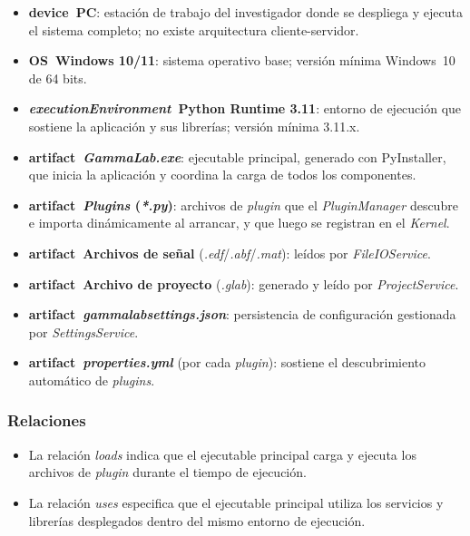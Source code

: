 \documentclass[12pt,letterpaper,oneside]{article}
\DeclareRobustCommand{\_}{\textunderscore\allowbreak}
\begin{document}
\begin{itemize}
    \item \textbf{\guillemotleft device\guillemotright\ PC}: estaci\'on de trabajo del investigador donde se despliega y ejecuta el sistema completo; no existe arquitectura cliente-servidor.
    \item \textbf{\guillemotleft OS\guillemotright\ Windows 10/11}: sistema operativo base; versi\'on m\'inima Windows~10 de 64 bits.
    \item \textbf{\guillemotleft \textit{executionEnvironment}\guillemotright\ Python Runtime 3.11}: entorno de ejecuci\'on que sostiene la aplicaci\'on y sus librer\'ias; versi\'on m\'inima 3.11.x.
    \item \textbf{\guillemotleft artifact\guillemotright\ \textit{GammaLab.exe}}: ejecutable principal, generado con PyInstaller, que inicia la aplicaci\'on y coordina la carga de todos los componentes.
    \item \textbf{\guillemotleft artifact\guillemotright\ \textit{Plugins} (\textit{*.py})}: archivos de \textit{plugin} que el \textit{PluginManager} descubre e importa din\'amicamente al arrancar, y que luego se registran en el \textit{Kernel}.
    \item \textbf{\guillemotleft artifact\guillemotright\ Archivos de se\~nal} (\textit{.edf}/\textit{.abf}/\textit{.mat}): le\'idos por \textit{FileIOService}.
    \item \textbf{\guillemotleft artifact\guillemotright\ Archivo de proyecto} (\textit{.glab}): generado y le\'ido por \textit{ProjectService}.
    \item \textbf{\guillemotleft artifact\guillemotright\ \textit{gamma\_\allowbreak lab\_\allowbreak settings.\allowbreak json}}: persistencia de configuraci\'on gestionada por \textit{Settings\-Service}.
    \item \textbf{\guillemotleft artifact\guillemotright\ \textit{properties.yml}} (por cada \textit{plugin}): sostiene el descubrimiento autom\'atico de \textit{plugins}.
\end{itemize}

\subsubsection{Relaciones}

\begin{itemize}
    \item La relaci\'on \textit{loads} indica que el ejecutable principal carga y ejecuta los archivos de \textit{plugin} durante el tiempo de ejecuci\'on.
    \item La relaci\'on \textit{uses} especifica que el ejecutable principal utiliza los servicios y librer\'ias desplegados dentro del mismo entorno de ejecuci\'on.
\end{itemize}
\end{document}
